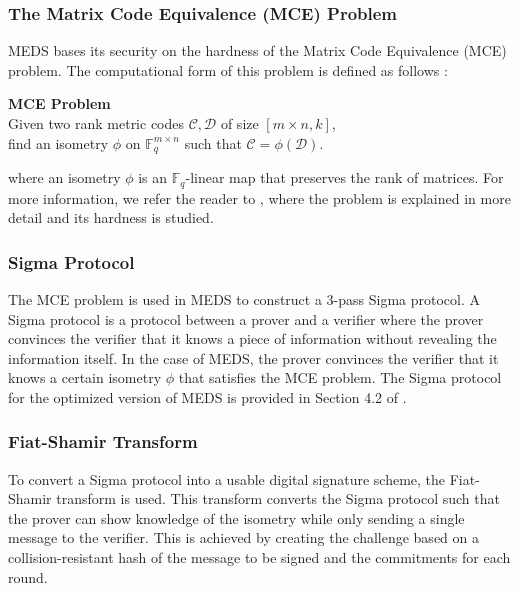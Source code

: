 \documentclass[11pt,a4paper]{report}
\theoremstyle{definition}
\begin{document}
\subsubsection{The Matrix Code Equivalence (MCE) Problem}
MEDS bases its security on the hardness of the Matrix Code Equivalence (MCE) problem. The computational form of this problem is defined as follows \cite{chou2023meds}:
\begin{center}
  \textbf{MCE Problem}\\
  Given two rank metric codes $\mathcal{C}, \mathcal{D}$ of size $[m \times n, k]$,\\
  find an isometry $\phi$ on $\mathbb{F}_q^{m \times n}$ such that $\mathcal{C} = \phi(\mathcal{D})$.
\end{center}
where an isometry $\phi$ is an $\mathbb{F}_q$-linear map that preserves the rank of matrices. For more information, we refer the reader to \cite{reijnders2024hardness}, where the problem is explained in more detail and its hardness is studied.

\subsubsection{Sigma Protocol}
\label{sec:sigmaprotocol}
The MCE problem is used in MEDS to construct a 3-pass Sigma protocol. A Sigma protocol is a protocol between a prover and a verifier where the prover convinces the verifier that it knows a piece of information without revealing the information itself. In the case of MEDS, the prover convinces the verifier that it knows a certain isometry $\phi$ that satisfies the MCE problem. The Sigma protocol for the optimized version of MEDS is provided in Section 4.2 of \cite{chou2024reducing}.

\subsubsection{Fiat-Shamir Transform}
\label{sec:fiatshamir}
To convert a Sigma protocol into a usable digital signature scheme, the Fiat-Shamir transform \cite{fiat1986prove} is used. This transform converts the Sigma protocol such that the prover can show knowledge of the isometry while only sending a single message to the verifier. This is achieved by creating the challenge based on a collision-resistant hash of the message to be signed and the commitments for each round.
\end{document}
